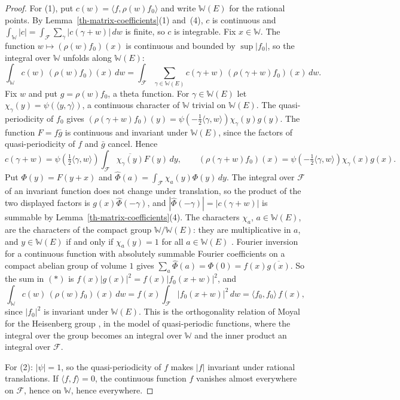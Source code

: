 \begin{proof}
For (1), put $c(w)=\langle f,\rho(w)f_0\rangle$ and write $\mathbb W(E)$ for
the rational points. By Lemma~\ref{th-matrix-coefficients}(1) and~(4), $c$ is
continuous and
$\int_{\mathbb W}|c|=\int_{\mathcal F}\sum_{\gamma}|c(\gamma+w)|\,dw$ is finite,
so $c$ is integrable. Fix $x\in\mathbb W$. The function
$w\mapsto(\rho(w)f_0)(x)$ is continuous and bounded by $\sup|f_0|$, so the
integral over $\mathbb W$ unfolds along $\mathbb W(E)$:
\[
\int_{\mathbb W}c(w)\,(\rho(w)f_0)(x)\,dw
=\int_{\mathcal F}\sum_{\gamma\in\mathbb W(E)}c(\gamma+w)\,(\rho(\gamma+w)f_0)(x)\,dw .\tag{$*$}
\]
Fix $w$ and put $g=\rho(w)f_0$, a theta function. For $\gamma\in\mathbb W(E)$
let $\chi_\gamma(y)=\psi(\langle y,\gamma\rangle)$, a continuous character of
$\mathbb W$ trivial on $\mathbb W(E)$. The quasi-periodicity of $f_0$ gives
$(\rho(\gamma+w)f_0)(y)=\psi(-\tfrac12\langle\gamma,w\rangle)\chi_\gamma(y)g(y)$.
The function $F=f\bar g$ is continuous and invariant under $\mathbb W(E)$, since
the factors of quasi-periodicity of $f$ and $\bar g$ cancel. Hence
\[
c(\gamma+w)=\psi(\tfrac12\langle\gamma,w\rangle)\int_{\mathcal F}\overline{\chi_\gamma(y)}F(y)\,dy,
\qquad
(\rho(\gamma+w)f_0)(x)=\psi(-\tfrac12\langle\gamma,w\rangle)\chi_\gamma(x)g(x).
\]
Put $\Phi(y)=F(y+x)$ and $\hat\Phi(a)=\int_{\mathcal F}\chi_a(y)\Phi(y)\,dy$. The
integral over $\mathcal F$ of an invariant function does not change under
translation, so the product of the two displayed factors is
$g(x)\hat\Phi(-\gamma)$, and $|\hat\Phi(-\gamma)|=|c(\gamma+w)|$ is summable by
Lemma~\ref{th-matrix-coefficients}(4). The characters $\chi_a$, $a\in\mathbb W(E)$,
are the characters of the compact group $\mathbb W/\mathbb W(E)$: they are
multiplicative in $a$, and $y\in\mathbb W(E)$ if and only if $\chi_a(y)=1$ for
all $a\in\mathbb W(E)$ \cite{Tat67}. Fourier inversion for a continuous
function with absolutely summable Fourier coefficients on a compact abelian
group of volume $1$ gives $\sum_a\hat\Phi(a)=\Phi(0)=f(x)\overline{g(x)}$. So
the sum in $(*)$ is $f(x)|g(x)|^2=f(x)|f_0(x+w)|^2$, and
\[
\int_{\mathbb W}c(w)\,(\rho(w)f_0)(x)\,dw=f(x)\int_{\mathcal F}|f_0(x+w)|^2\,dw
=\langle f_0,f_0\rangle\,f(x),
\]
since $|f_0|^2$ is invariant under $\mathbb W(E)$. This is the orthogonality
relation of Moyal for the Heisenberg group \cite[Chapter~1]{Fol89}, in the
model of quasi-periodic functions, where the integral over the group becomes
an integral over $\mathbb W$ and the inner product an integral over
$\mathcal F$.

For (2): $|\psi|=1$, so the quasi-periodicity of $f$ makes $|f|$ invariant under
rational translations. If $\langle f,f\rangle=0$, the continuous function $f$
vanishes almost everywhere on $\mathcal F$, hence on $\mathbb W$, hence
everywhere.


\end{proof}
